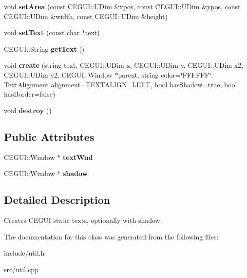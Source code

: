 \begin{DoxyCompactItemize}
\item 
\hypertarget{classStaticText_a4f0b561d2ce1b14769b8f33736552df2}{
void {\bfseries set\-Area} (const \-C\-E\-G\-U\-I\-::\-U\-Dim \&xpos, const \-C\-E\-G\-U\-I\-::\-U\-Dim \&ypos, const \-C\-E\-G\-U\-I\-::\-U\-Dim \&width, const \-C\-E\-G\-U\-I\-::\-U\-Dim \&height)}
\label{d0/d4a/classStaticText_a4f0b561d2ce1b14769b8f33736552df2}

\item 
\hypertarget{classStaticText_ac29e485efce5daff23ca844c02838516}{
void {\bfseries set\-Text} (const char $\ast$text)}
\label{d0/d4a/classStaticText_ac29e485efce5daff23ca844c02838516}

\item 
\hypertarget{classStaticText_ae6e8dd26867ed1432e3012f1ae9a7fb6}{
\-C\-E\-G\-U\-I\-::\-String {\bfseries get\-Text} ()}
\label{d0/d4a/classStaticText_ae6e8dd26867ed1432e3012f1ae9a7fb6}

\item 
\hypertarget{classStaticText_a5d90d644000b0b2bf05557c3c9f3259e}{
void {\bfseries create} (string text, \-C\-E\-G\-U\-I\-::\-U\-Dim x, \-C\-E\-G\-U\-I\-::\-U\-Dim y, \-C\-E\-G\-U\-I\-::\-U\-Dim x2, \-C\-E\-G\-U\-I\-::\-U\-Dim y2, \-C\-E\-G\-U\-I\-::\-Window $\ast$parent, string color=\char`\"{}\-F\-F\-F\-F\-F\-F\char`\"{}, \-Text\-Alignment alignment=\-T\-E\-X\-T\-A\-L\-I\-G\-N\-\_\-\-L\-E\-F\-T, bool has\-Shadow=true, bool has\-Border=false)}
\label{d0/d4a/classStaticText_a5d90d644000b0b2bf05557c3c9f3259e}

\item 
\hypertarget{classStaticText_addf7cae6059e9ca133f2d9809affb5d8}{
void {\bfseries destroy} ()}
\label{d0/d4a/classStaticText_addf7cae6059e9ca133f2d9809affb5d8}

\end{DoxyCompactItemize}
\subsection*{\-Public \-Attributes}
\begin{DoxyCompactItemize}
\item 
\hypertarget{classStaticText_aab84fff7c6b24f36d6d1f742792629d1}{
\-C\-E\-G\-U\-I\-::\-Window $\ast$ {\bfseries text\-Wnd}}
\label{d0/d4a/classStaticText_aab84fff7c6b24f36d6d1f742792629d1}

\item 
\hypertarget{classStaticText_a11457510eca70f938b160792d444700f}{
\-C\-E\-G\-U\-I\-::\-Window $\ast$ {\bfseries shadow}}
\label{d0/d4a/classStaticText_a11457510eca70f938b160792d444700f}

\end{DoxyCompactItemize}


\subsection{\-Detailed \-Description}
\-Creates \-C\-E\-G\-U\-I static texts, optionally with shadow. 

\-The documentation for this class was generated from the following files\-:\begin{DoxyCompactItemize}
\item 
include/util.\-h\item 
src/util.\-cpp\end{DoxyCompactItemize}
